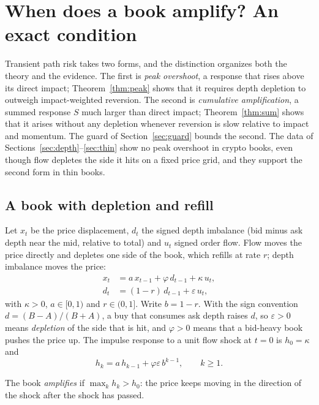 \section{When does a book amplify? An exact condition}\label{sec:t6}

Transient path risk takes two forms, and the distinction organizes both the theory and the evidence. The first is \emph{peak overshoot}, a response that rises above its direct impact; Theorem~\ref{thm:peak} shows that it requires depth depletion to outweigh impact-weighted reversion. The second is \emph{cumulative amplification}, a summed response $S$ much larger than direct impact; Theorem~\ref{thm:sum} shows that it arises without any depletion whenever reversion is slow relative to impact and momentum. The guard of Section~\ref{sec:guard} bounds the second. The data of Sections~\ref{sec:depth}--\ref{sec:thin} show no peak overshoot in crypto books, even though flow depletes the side it hits on a fixed price grid, and they support the second form in thin books.

\subsection{A book with depletion and refill}
Let $x_t$ be the price displacement, $d_t$ the signed depth imbalance (bid minus ask depth near the mid, relative to total) and $u_t$ signed order flow. Flow moves the price directly and depletes one side of the book, which refills at rate $r$; depth imbalance moves the price:
\begin{align}
x_t &= a\,x_{t-1} + \varphi\,d_{t-1} + \kappa\,u_t, \label{eq:x}\\
d_t &= (1-r)\,d_{t-1} + \varepsilon\,u_t, \label{eq:d}
\end{align}
with $\kappa>0$, $a\in[0,1)$ and $r\in(0,1]$. Write $b=1-r$. With the sign convention $d=(B-A)/(B+A)$, a buy that consumes ask depth raises $d$, so $\varepsilon>0$ means \emph{depletion} of the side that is hit, and $\varphi>0$ means that a bid-heavy book pushes the price up. The impulse response to a unit flow shock at $t=0$ is $h_0=\kappa$ and
\begin{equation}\label{eq:rec}
h_k=a\,h_{k-1}+\varphi\varepsilon\,b^{k-1},\qquad k\ge1.
\end{equation}

\begin{definition}
The book \emph{amplifies} if $\max_kh_k>h_0$: the price keeps moving in the direction of the shock after the shock has passed.
\end{definition}

